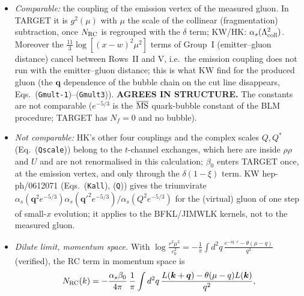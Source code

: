 \begin{itemize}
\item \emph{Comparable:} the coupling of the emission vertex of the measured gluon. In TARGET it is $g^{2}(\mu)$ with $\mu$ the scale of the collinear (fragmentation) subtraction, once $N_{\rm RC}$ is regrouped with the $\delta$ term; KW/HK: $\alpha_{s}(\Lambda^{2}_{\rm coll})$. Moreover the $\frac{11}{3}\log[(x-w)^{2}\mu^{2}]$ terms of Group~I (emitter--gluon distance) cancel between Rows~II and V, i.e.\ the emission coupling does not run with the emitter--gluon distance; this is what KW find for the produced gluon (the $\boldsymbol q$ dependence of the bubble chain on the cut line disappears, Eqs.~(\texttt{Gmult-1})--(\texttt{Gmult3})). \textbf{AGREES IN STRUCTURE.} The constants are not comparable ($e^{-5/3}$ is the $\overline{\rm MS}$ quark-bubble constant of the BLM procedure; TARGET has $N_{f}=0$ and no bubble).
\item \emph{Not comparable:} HK's other four couplings and the complex scales $Q,Q^{*}$ (Eq.~(\texttt{Qscale})) belong to the $t$-channel exchanges, which here are inside $\rho\rho$ and $U$ and are not renormalised in this calculation; $\beta_{0}$ enters TARGET once, at the emission vertex, and only through the $\delta(1-\xi)$ term. KW hep-ph/0612071 (Eqs.~(\texttt{Kall}), (\texttt{Q})) gives the triumvirate $\alpha_{s}(\boldsymbol q^{2}e^{-5/3})\alpha_{s}(\boldsymbol q'^{2}e^{-5/3})/\alpha_{s}(Q^{2}e^{-5/3})$ for the (virtual) gluon of one step of small-$x$ evolution; it applies to the BFKL/JIMWLK kernels, not to the measured gluon.
\item \emph{Dilute limit, momentum space.} With $\log\frac{r^{2}\mu^{2}}{c_{0}^{2}}=-\frac{1}{\pi}\int d^{2}q\,\frac{e^{-iq\cdot r}-\theta(\mu-q)}{q^{2}}$ (verified), the RC term in momentum space is
\begin{equation}
N_{\rm RC}(k)=-\frac{\alpha_{s}\beta_{0}}{4\pi}\,\frac{1}{\pi}\int d^{2}q\,\frac{L(\boldsymbol k+\boldsymbol q)-\theta(\mu-q)L(\boldsymbol k)}{q^{2}},
\end{equation}

\end{itemize}
